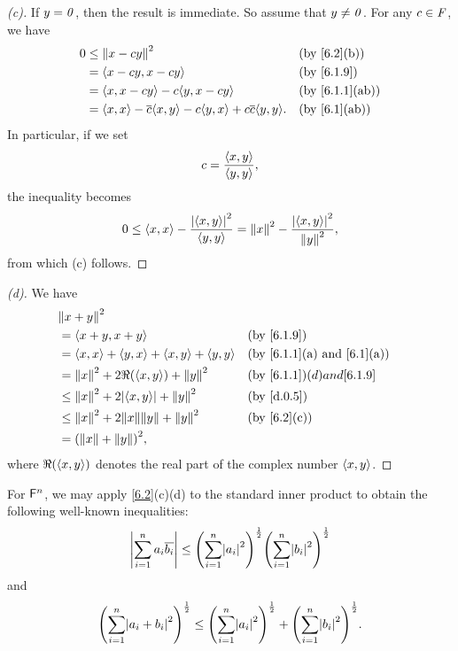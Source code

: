 \begin{proof}[(c)]
	If \(y = \mathit{0}\), then the result is immediate.
	So assume that \(y \neq \mathit{0}\).
	For any \(c \in \mathit{F}\), we have
	\begin{align*}
		0 & \leq \norm{x - cy}^2                                                       &  & \by{6.2}[b]    \\
		  & = \inn{x - cy, x - cy}                                                     &  & \by{6.1.9}     \\
		  & = \inn{x, x - cy} - c \inn{y, x - cy}                                      &  & \by{6.1.1}[ab] \\
		  & = \inn{x, x} - \conj{c} \inn{x, y} - c \inn{y, x} + c \conj{c} \inn{y, y}. &  & \by{6.1}[ab]
	\end{align*}
	In particular, if we set
	\[
		c = \frac{\left\langle x, y\right\rangle}{\left\langle y, y\right\rangle},
	\]
	the inequality becomes
	\[
		0 \leq \left\langle x, x\right\rangle - \frac{\left\lvert\left\langle x, y\right\rangle\right\rvert^2}{\left\langle y, y\right\rangle} = \left\lVert x\right\rVert^2 - \frac{\left\lvert\left\langle x, y\right\rangle\right\rvert^2}{\left\lVert y\right\rVert^2},
	\]
	from which (c) follows.
\end{proof}

\begin{proof}[(d)]
	We have
	\begin{align*}
		 & \norm{x + y}^2                                                                                         \\
		 & = \inn{x + y, x + y}                                &  & \by{6.1.9}                                    \\
		 & = \inn{x, x} + \inn{y, x} + \inn{x, y} + \inn{y, y} &  & \text{(by \cref{6.1.1}(a) and \cref{6.1}(a))} \\
		 & = \norm{x}^2 + 2 \Re(\inn{x, y}) + \norm{y}^2       &  & \by{6.1.1}(d) and \cref{6.1.9}                \\
		 & \leq \norm{x}^2 + 2 \abs{\inn{x, y}} + \norm{y}^2   &  & \by{d.0.5}                                    \\
		 & \leq \norm{x}^2 + 2 \norm{x} \norm{y} + \norm{y}^2  &  & \by{6.2}[c]                                   \\
		 & = \pa{\norm{x} + \norm{y}}^2,
	\end{align*}
	where \(\Re(\left\langle x, y\right\rangle)\) denotes the real part of the complex number \(\left\langle x, y\right\rangle\).
\end{proof}

\begin{eg}\label{6.1.11}
	For \(\mathsf{F}^n\), we may apply \cref{6.2}(c)(d) to the standard inner product to obtain the following well-known inequalities:
	\[
		\abs{\sum_{i = 1}^n a_i \conj{b_i}} \leq \pa{\sum_{i = 1}^n \abs{a_i}^2}^{\frac{1}{2}} \pa{\sum_{i = 1}^n \abs{b_i}^2}^{\frac{1}{2}}
	\]
	and
	\[
		\pa{\sum_{i = 1}^n \abs{a_i + b_i}^2}^{\frac{1}{2}} \leq \pa{\sum_{i = 1}^n \abs{a_i}^2}^{\frac{1}{2}} + \pa{\sum_{i = 1}^n \abs{b_i}^2}^{\frac{1}{2}}.
	\]
\end{eg}


